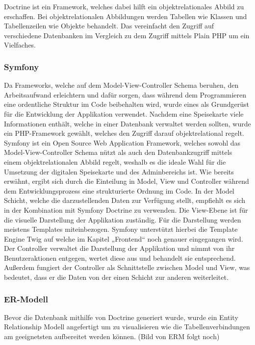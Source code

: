 	Doctrine ist ein Framework, welches dabei hilft ein objektrelationales Abbild zu erschaffen. Bei objektrelationalen Abbildungen werden Tabellen wie Klassen und Tabellenzeilen wie Objekte behandelt. Das vereinfacht den Zugriff auf verschiedene Datenbanken im Vergleich zu dem Zugriff mittels Plain PHP um ein Vielfaches.

    \subsubsection{Symfony}

	Da Frameworks, welche auf dem Model-View-Controller Schema beruhen, den Arbeitsaufwand erleichtern und dafür sorgen, dass während dem Programmieren eine ordentliche Struktur im Code beibehalten wird, wurde eines als Grundgerüst für die Entwicklung der Applikation verwendet. Nachdem eine Speisekarte viele Informationen enthält, welche in einer Datenbank verwaltet werden sollten, wurde ein PHP-Framework gewählt, welches den Zugriff darauf objektrelational regelt.
	Symfony ist ein Open Source Web Application Framework, welches sowohl das Model-View-Controller Schema nützt als auch den Datenbankzugriff mittels einem objektrelationalen Abbild regelt, weshalb es die ideale Wahl für die Umsetzung der digitalen Speisekarte und des Adminbereichs ist. Wie bereits erwähnt, ergibt sich durch die Einteilung in Model, View und Controller während dem Entwicklungsprozess eine strukturierte Ordnung im Code. In der Model Schicht, welche die darzustellenden Daten zur Verfügung stellt, empfiehlt es sich in der Kombination mit Symfony Doctrine zu verwenden. Die View-Ebene ist für die visuelle Darstellung der Applikation zuständig. Für die  Darstellung werden meistens Templates miteinbezogen. Symfony unterstützt hierbei die Template Engine Twig auf welche im Kapitel „Frontend“ noch genauer eingegangen wird.
	Der Controller verwaltet die Darstellung der Applikation und nimmt von ihr Benutzeraktionen entgegen, wertet diese aus und behandelt sie entsprechend. Außerdem fungiert der Controller als Schnittstelle zwischen Model und View, was bedeutet, dass er die Daten von der einen Schicht zur anderen weiterleitet.

    \subsubsection{ER-Modell}

	Bevor die Datenbank mithilfe von Doctrine generiert wurde, wurde ein Entity Relationship Modell angefertigt um zu visualisieren wie die Tabellenverbindungen am geeignetsten aufbereitet werden können.
	(Bild von ERM folgt noch)

